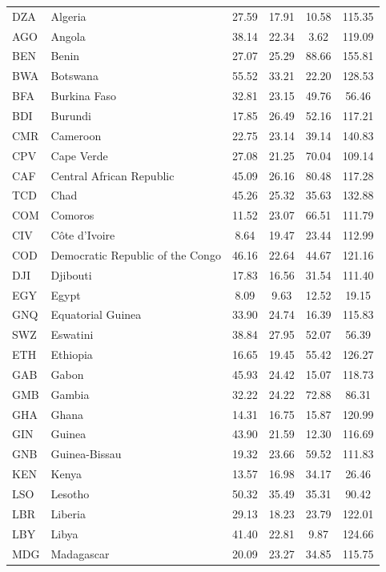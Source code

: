 \begin{center}
\begin{longtable}{llcccc}
  DZA & Algeria & 27.59 & 17.91 & 10.58 & 115.35 \\ 
  AGO & Angola & 38.14 & 22.34 & 3.62 & 119.09 \\ 
  BEN & Benin & 27.07 & 25.29 & 88.66 & 155.81 \\ 
  BWA & Botswana & 55.52 & 33.21 & 22.20 & 128.53 \\ 
  BFA & Burkina Faso & 32.81 & 23.15 & 49.76 & 56.46 \\ 
  BDI & Burundi & 17.85 & 26.49 & 52.16 & 117.21 \\ 
  CMR & Cameroon & 22.75 & 23.14 & 39.14 & 140.83 \\ 
  CPV & Cape Verde & 27.08 & 21.25 & 70.04 & 109.14 \\ 
  CAF & Central African Republic & 45.09 & 26.16 & 80.48 & 117.28 \\ 
  TCD & Chad & 45.26 & 25.32 & 35.63 & 132.88 \\ 
  COM & Comoros & 11.52 & 23.07 & 66.51 & 111.79 \\ 
  CIV & Côte d’Ivoire & 8.64 & 19.47 & 23.44 & 112.99 \\ 
  COD & Democratic Republic of the Congo & 46.16 & 22.64 & 44.67 & 121.16 \\ 
  DJI & Djibouti & 17.83 & 16.56 & 31.54 & 111.40 \\ 
  EGY & Egypt & 8.09 & 9.63 & 12.52 & 19.15 \\ 
  GNQ & Equatorial Guinea & 33.90 & 24.74 & 16.39 & 115.83 \\ 
  SWZ & Eswatini & 38.84 & 27.95 & 52.07 & 56.39 \\ 
  ETH & Ethiopia & 16.65 & 19.45 & 55.42 & 126.27 \\ 
  GAB & Gabon & 45.93 & 24.42 & 15.07 & 118.73 \\ 
  GMB & Gambia & 32.22 & 24.22 & 72.88 & 86.31 \\ 
  GHA & Ghana & 14.31 & 16.75 & 15.87 & 120.99 \\ 
  GIN & Guinea & 43.90 & 21.59 & 12.30 & 116.69 \\ 
  GNB & Guinea-Bissau & 19.32 & 23.66 & 59.52 & 111.83 \\ 
  KEN & Kenya & 13.57 & 16.98 & 34.17 & 26.46 \\ 
  LSO & Lesotho & 50.32 & 35.49 & 35.31 & 90.42 \\ 
  LBR & Liberia & 29.13 & 18.23 & 23.79 & 122.01 \\ 
  LBY & Libya & 41.40 & 22.81 & 9.87 & 124.66 \\ 
  MDG & Madagascar & 20.09 & 23.27 & 34.85 & 115.75 \\ 

\end{longtable}
\end{center}
